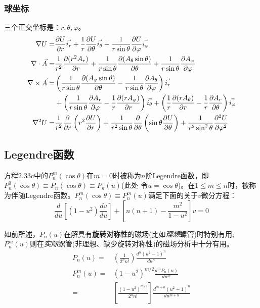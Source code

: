 \subsubsection{球坐标}
三个正交坐标是：$r, \theta, \varphi$。
\begin{subequations}\label{eqn:field sphl}
	\begin{align}
\nabla U=&\frac{\partial U}{\partial r}\vec{i_r} +\frac{1}{r}\frac{\partial U}{\partial \theta}\vec{i_{\theta}}+\frac{1}{r\sin\theta}\frac{\partial U}{\partial \varphi}\vec{i_\varphi}\\
\nabla\cdot \vec{A} =& \frac{1}{r^2}\frac{\partial{(r^2 A_r)}}{\partial r} +\frac{1}{r\sin\theta}\frac{\partial{(A_\theta \sin\theta)}}{\partial\theta}+\frac{1}{r\sin\theta}\frac{\partial{A_\varphi}}{\partial \varphi} \\
\nabla\times \vec{A}=& \left(\frac{1}{r\sin\theta}\frac{\partial{(A_\varphi \sin\theta)}}{\partial \theta} -\frac{1}{r\sin\theta}\frac{\partial{A_\theta}}{\partial \varphi}\right)\vec{i_r} \notag \\
& + \left(\frac{1}{r\sin\theta}\frac{\partial{A_r}}{\partial \varphi} -\frac{1}{r}\frac{\partial{(r A_\varphi)}}{\partial r}\right) \vec{i_\theta}
+ \left(\frac{1}{r}\frac{\partial{(r A_\theta)}}{\partial r} -\frac{1}{r}\frac{\partial{A_r}}{\partial \theta}\right)\vec{i_\varphi}  \\
\nabla^2 U=&\frac{1}{r^2}\frac{\partial}{\partial r}\left(r^2\frac{\partial U}{\partial r}\right)+
\frac{1}{r^2\sin\theta}\frac{\partial}{\partial\theta}\left(\sin\theta\frac{\partial U}{\partial \theta}\right)+\frac{1}{r^2\sin^2\theta}\frac{\partial^2 U}{\partial \varphi^2}
  	\end{align}
\end{subequations}


\subsection{Legendre函数}
方程2.33c中的$P_n^m(\cos\theta)$在$m=0$时被称为$n$阶Legendre函数，即$P_n^0(\cos\theta)\equiv P_n(\cos\theta)\equiv P_n(u)$(此处
令$u=\cos\theta$)。在$1\le m \le n$时，被称为伴随Legendre函数。$P_n^m(\cos\theta)\equiv P_n^m(u)$满足下面的关于$v$微分方程：
\begin{equation}\label{eqn:legendre diff}
  \frac{d}{du}\left[(1-u^2)\frac{dv}{du}\right]+\left[n(n+1)-\frac{m^2}{1-u^2}\right]v=0
\end{equation}

如前所述，$P_n(u)$在解具有\textbf{旋转对称性}的磁场(比如\textit{理想}螺管)时特别有用;
$P_n^m(u)$则在\textit{实际}螺管(非理想、缺少旋转对称性)的磁场分析中十分有用。
\begin{subequations}\label{eqn:legendre function1}
	\begin{align}
P_n(u)=&\left(\frac{1}{2^n n!}\right)\frac{d^n(u^2-1)^n}{du^n} \\
P_n^m(u)=&(1-u^2)^{m/2}\frac{d^mP_n(u)}{du^m}\\
=&\left[\frac{(1-u^2)^{m/2}}{2^n n!}\right]\frac{d^{m+n}(u^2-1)^n}{du^{m+n}}
  	\end{align}
\end{subequations}

